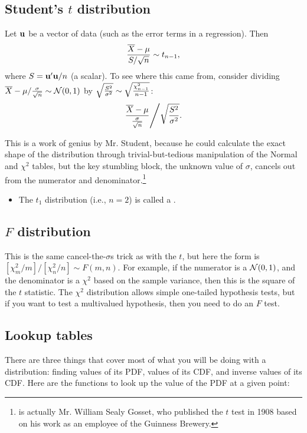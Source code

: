 \subsection{Student's $t$ distribution} \label{tstat}
Let ${\bf u}$ be
a vector of data (such as the error terms in a regression). Then
$${\overline X - \mu \over S/\sqrt{n}}\sim t_{n-1},$$
where $S={\bf u}'{\bf u}/n$ (a scalar).  To see where this came from, consider
dividing ${\overline X -\mu /{\sigma\over \sqrt{n}}}\sim {\cal N}(0,1)$
by $\sqrt{S^2\over \sigma^2}\sim {\sqrt{\chi^2_{n-1}\over n-1}}$:
$${{\overline X -\mu \over {\sigma\over \sqrt{n}}}\Bigg/
\sqrt{S^2\over \sigma^2}}.$$

This is a work of genius by
Mr. Student, because he could calculate the exact shape of the distribution 
through trivial-but-tedious manipulation of the Normal and $\chi^2$
tables, but the key stumbling block, the unknown value of $\sigma$,
cancels out from the numerator and denominator.\footnote{
is actually Mr. William Sealy Gosset, who published the $t$ test in 1908
based on his work as an employee of the Guinness Brewery. 
}

\begin{itemize}
\item The $t_1$ distribution (i.e., $n=2$) is called a .
\end{itemize}


\subsection{$F$ distribution}  This is the same cancel-the-$\sigma$s trick as with the $t$, but here the form
is $[\chi^2_m/m]/[\chi^2_n/n]\sim F(m,n)$. For example, if the numerator
is a ${\cal N}(0,1)$, and the denominator is a $\chi^2$ based on the
sample variance, then this is the square of the $t$ statistic.
The $\chi^2$ distribution 
allows simple one-tailed hypothesis tests, but if you want to test a
multivalued hypothesis, then you need to do an $F$ test.

\subsection{Lookup tables}
There are three things that cover most of what you will be doing with a
distribution: finding values of its PDF, values of its CDF, and inverse
values of its CDF.
Here are the functions to look up the value of the PDF at a given point:

